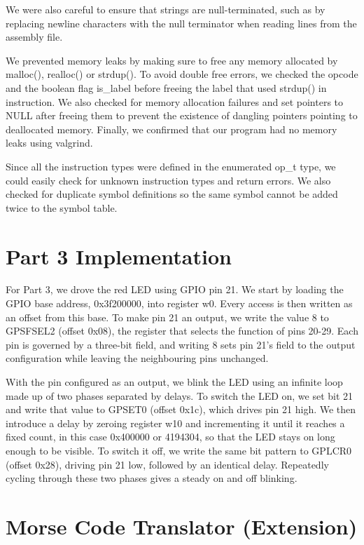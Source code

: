 \documentclass[11pt]{article}
\begin{document}
We were also careful to ensure that strings are null-terminated, such as by replacing newline characters with the null terminator when reading lines from the assembly file.

We prevented memory leaks by making sure to free any memory allocated by malloc(), realloc() or strdup(). To avoid double free errors, we checked the opcode and the boolean flag is\_label before freeing the label that used strdup() in instruction. We also checked for memory allocation failures and set pointers to NULL after freeing them to prevent the existence of dangling pointers pointing to deallocated memory. Finally, we confirmed that our program had no memory leaks using valgrind.

Since all the instruction types were defined in the enumerated op\_t type, we could easily check for unknown instruction types and return errors. We also checked for duplicate symbol definitions so the same symbol cannot be added twice to the symbol table.

\section{Part 3 Implementation}
For Part 3, we drove the red LED using GPIO pin 21. We start by
loading the GPIO base address, 0x3f200000, into register w0. Every access is then written as an offset from this base. To make pin 21 an output, we write the value 8 to GPSFSEL2 (offset 0x08), the register that selects the function of pins 20-29. Each pin is governed by a three-bit field, and writing 8 sets pin 21's field to the output configuration while leaving the neighbouring pins unchanged.

With the pin configured as an output, we blink the LED using an
infinite loop made up of two phases separated by delays. To switch the LED on, we set bit 21 and write that value to GPSET0 (offset 0x1c), which drives pin 21 high. We then introduce a delay by zeroing register w10 and incrementing it until it reaches a fixed count, in this case 0x400000 or 4194304, so that the LED stays on long enough to be visible. To switch it off, we write the same bit pattern to GPLCR0 (offset 0x28), driving pin 21 low, followed by an identical delay. Repeatedly cycling through these two phases gives a steady on and off blinking. 


\section{Morse Code Translator (Extension)}
\end{document}
